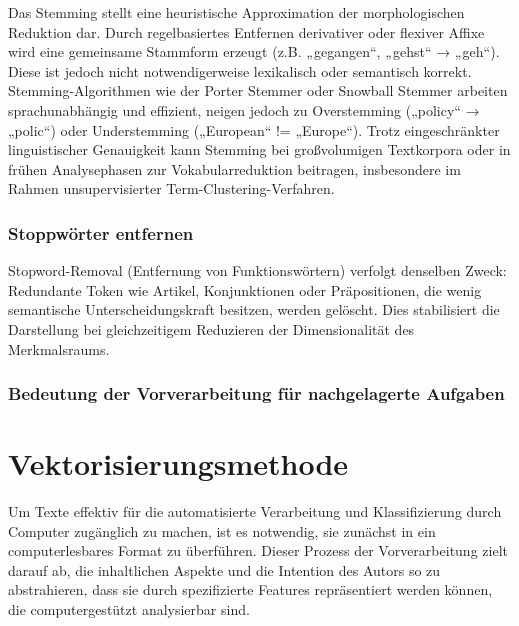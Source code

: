 
Das Stemming stellt eine heuristische Approximation der morphologischen Reduktion dar. Durch regelbasiertes Entfernen derivativer oder flexiver Affixe wird eine gemeinsame Stammform erzeugt (z.B. „gegangen“, „gehst“ → „geh“). Diese ist jedoch nicht notwendigerweise lexikalisch oder semantisch korrekt. Stemming-Algorithmen wie der Porter Stemmer oder Snowball Stemmer arbeiten sprachunabhängig und effizient, neigen jedoch zu Overstemming („policy“ → „polic“) oder Understemming („European“ != „Europe“).
Trotz eingeschränkter linguistischer Genauigkeit kann Stemming bei großvolumigen Textkorpora oder in frühen Analysephasen zur Vokabularreduktion beitragen, insbesondere im Rahmen unsupervisierter Term-Clustering-Verfahren.

\subsubsection{Stoppwörter entfernen}

Stopword-Removal (Entfernung von Funktionswörtern) verfolgt denselben Zweck: Redundante Token wie Artikel, Konjunktionen oder Präpositionen, die wenig semantische Unterscheidungskraft besitzen, werden gelöscht. Dies stabilisiert die Darstellung bei gleichzeitigem Reduzieren der Dimensionalität des Merkmalsraums.

\subsubsection{Bedeutung der Vorverarbeitung für nachgelagerte Aufgaben}


\section{Vektorisierungsmethode}

Um Texte effektiv für die automatisierte Verarbeitung und Klassifizierung durch Computer zugänglich zu machen, ist es notwendig, sie zunächst in ein computerlesbares Format zu überführen. Dieser Prozess der Vorverarbeitung zielt darauf ab, die inhaltlichen Aspekte und die Intention des Autors so zu abstrahieren, dass sie durch spezifizierte Features repräsentiert werden können, die computergestützt analysierbar sind.

